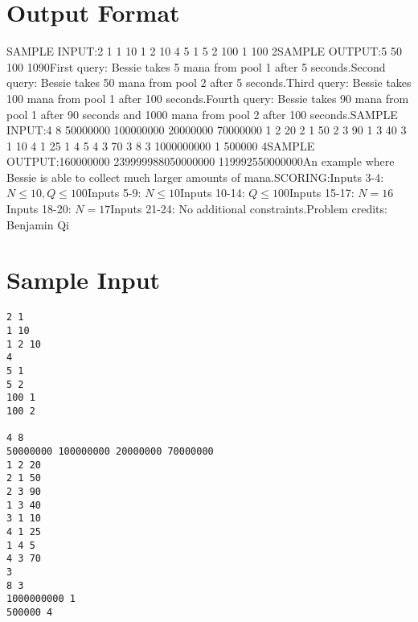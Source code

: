 \documentclass[12pt]{article}
\begin{document}
\section*{Output Format}
SAMPLE INPUT:2 1
1 10
1 2 10
4
5 1
5 2
100 1
100 2SAMPLE OUTPUT:5
50
100
1090First query: Bessie takes 5 mana from pool 1 after 5 seconds.Second query: Bessie takes 50 mana from pool 2 after 5 seconds.Third query: Bessie takes 100 mana from pool 1 after 100 seconds.Fourth query: Bessie takes 90 mana from pool 1 after 90 seconds and 1000 mana
from pool 2 after 100 seconds.SAMPLE INPUT:4 8
50000000 100000000 20000000 70000000
1 2 20
2 1 50
2 3 90
1 3 40
3 1 10
4 1 25
1 4 5
4 3 70
3
8 3
1000000000 1
500000 4SAMPLE OUTPUT:160000000
239999988050000000
119992550000000An example where Bessie is able to collect much larger amounts of mana.SCORING:Inputs 3-4: $N\le 10, Q\le 100$Inputs 5-9: $N\le 10$Inputs 10-14: $Q\le 100$Inputs 15-17: $N = 16$Inputs 18-20: $N = 17$Inputs 21-24: No additional constraints.Problem credits: Benjamin Qi

\section*{Sample Input}
\begin{verbatim}
2 1
1 10
1 2 10
4
5 1
5 2
100 1
100 2

4 8
50000000 100000000 20000000 70000000
1 2 20
2 1 50
2 3 90
1 3 40
3 1 10
4 1 25
1 4 5
4 3 70
3
8 3
1000000000 1
500000 4
\end{verbatim}
\end{document}

